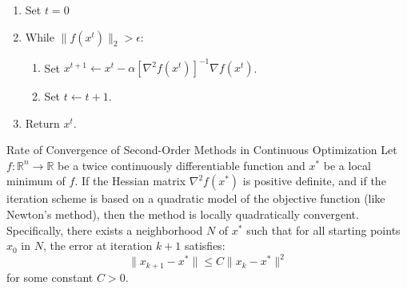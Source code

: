 \begin{enumerate}
\item Set $t= 0$
\item While $\| f(x^t)\|_2 > \epsilon$:
\begin{enumerate}
\item Set $x^{t+1} \leftarrow x^t - \alpha [\nabla^2 f(x^t)]^{-1} \nabla f(x^t)$.
\item Set $t \leftarrow t+1$.
\end{enumerate}
\item Return $x^t$.
\end{enumerate}


\begin{theorem}{Rate of Convergence of Second-Order Methods in Continuous Optimization}{}
Let $ f: \mathbb{R}^n \rightarrow \mathbb{R} $ be a twice continuously differentiable function and $ x^* $ be a local minimum of $ f $. If the Hessian matrix $ \nabla^2 f(x^*) $ is positive definite, and if the iteration scheme is based on a quadratic model of the objective function (like Newton's method), then the method is locally quadratically convergent. Specifically, there exists a neighborhood $ N $ of $ x^* $ such that for all starting points $ x_0 $ in $ N $, the error at iteration $ k+1 $ satisfies:
\[
\| x_{k+1} - x^* \| \leq C \| x_k - x^* \|^2
\]
for some constant $ C > 0 $.
\end{theorem}

